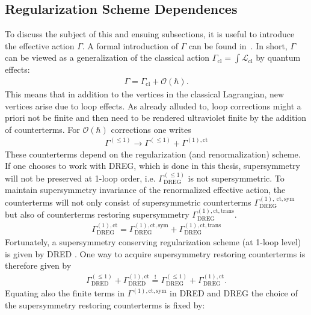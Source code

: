 \subsection{Regularization Scheme Dependences}\label{sec:RegSchemeDep}
To discuss the subject of this and ensuing subsections, it is useful to introduce the effective action $\Gamma$. A formal introduction of $\Gamma$ can be found in~\cite{Peskin}. In short, $\Gamma$ can be viewed as a generalization of the classical action $\Gamma_{\mathrm{cl}} = \int \mathcal{L}_{\mathrm{cl}}$ by quantum effects:
\begin{align}
\Gamma = \Gamma_{\mathrm{cl}} + \mathcal{O}(\hbar).
\end{align}
This means that in addition to the vertices in the classical Lagrangian, new vertices arise due to loop effects. As already alluded to, loop corrections might a priori not be finite and then need to be rendered ultraviolet finite by the addition of counterterms. For $\mathcal{O}(\hbar)$ corrections one writes
\begin{align}
\Gamma^{(\leq 1)} \to \Gamma^{(\leq 1)} + \Gamma^{(1),\mathrm{ct}}
\end{align} 
These counterterms depend on the regularization (and renormalization) scheme. If one chooses to work with DREG, which is done in this thesis, supersymmetry will not be preserved at 1-loop order, i.e. $\Gamma^{(\leq 1)}_{\mathrm{DREG}}$ is not supersymmetric. To maintain supersymmetry invariance of the renormalized effective action, the counterterms will not only consist of supersymmetric counterterms $\Gamma^{(1),\ \mathrm{ct,sym}}_{\mathrm{DREG}}$ but also of counterterms restoring supersymmetry $\Gamma^{(1),\mathrm{ct,trans}}_{\mathrm{DREG}}$. 
\begin{align}
\Gamma^{(1),\mathrm{ct}}_{\mathrm{DREG}} = \Gamma^{(1),\mathrm{ct,sym}}_{\mathrm{DREG}} + \Gamma^{(1),\mathrm{ct,trans}}_{\mathrm{DREG}}
\end{align}
Fortunately, a supersymmetry conserving regularization scheme (at 1-loop level) is given by DRED \cite{Hollik:2001cz}. One way to acquire supersymmetry restoring counterterms is therefore given by
\begin{align}
\Gamma^{(\leq 1)}_{\mathrm{DRED}} + \Gamma^{(1),\mathrm{ct}}_{\mathrm{DRED}} \overset{!}{=} \Gamma^{(\leq 1)}_{\mathrm{DREG}} + \Gamma^{(1),\mathrm{ct}}_{\mathrm{DREG}}.
\end{align}
Equating also the finite terms in $\Gamma^{(1),\mathrm{ct,sym}}$ in DRED and DREG the choice of the supersymmetry restoring counterterms is fixed by\cite{Varso, Stockinger:2011gp, Martin:1993yx}:

